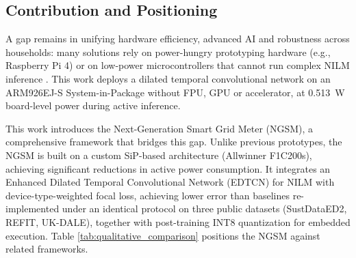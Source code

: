\documentclass[fleqn,10pt]{wlscirep}
\begin{document}
\subsection{Contribution and Positioning}
\label{subsec:contribution}

A gap remains in unifying hardware efficiency, advanced AI and robustness across households: many solutions rely on power-hungry prototyping hardware (e.g., Raspberry Pi 4) or on low-power microcontrollers that cannot run complex NILM inference \cite{EdgeNILM2025}. This work deploys a dilated temporal convolutional network on an ARM926EJ-S System-in-Package without FPU, GPU or accelerator, at 0.513~W board-level power during active inference.

This work introduces the Next-Generation Smart Grid Meter (NGSM), a comprehensive framework that bridges this gap. Unlike previous prototypes, the NGSM is built on a custom SiP-based architecture (Allwinner F1C200s), achieving significant reductions in active power consumption. It integrates an Enhanced Dilated Temporal Convolutional Network (EDTCN) for NILM with device-type-weighted focal loss, achieving lower error than baselines re-implemented under an identical protocol on three public datasets (SustDataED2, REFIT, UK-DALE), together with post-training INT8 quantization for embedded execution. Table \ref{tab:qualitative_comparison} positions the NGSM against related frameworks.
\end{document}

